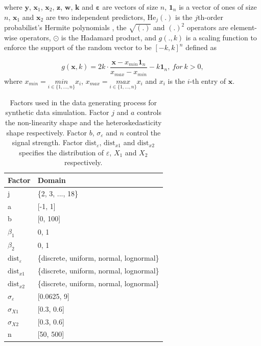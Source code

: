 \documentclass[]{interact}
\theoremstyle{plain}%
\theoremstyle{definition}
\theoremstyle{remark}
\begin{document}
\noindent where \(\boldsymbol{y}\), \(\boldsymbol{x}_1\),
\(\boldsymbol{x}_2\), \(\boldsymbol{z}\), \(\boldsymbol{w}\),
\(\boldsymbol{k}\) and \(\boldsymbol{\varepsilon}\) are vectors of size
\(n\), \(\boldsymbol{1}_n\) is a vector of ones of size \(n\),
\(\boldsymbol{x}_1\) and \(\boldsymbol{x}_2\) are two independent
predictors, \(\text{He}_j(.)\) is the \(j\)th-order probabilist's
Hermite polynomials \citep{hermite1864nouveau}, the \(\sqrt{(.)}\) and
\((.)^2\) operators are element-wise operators, \(\odot\) is the
Hadamard product, and \(g(., k)\) is a scaling function to enforce the
support of the random vector to be \([-k, k]^n\) defined as

\[g(\boldsymbol{x}, k) = 2k \cdot \frac{\boldsymbol{x} - x_{min}\boldsymbol{1}_n}{x_{max} - x_{min}} - k\boldsymbol{1}_n,~for~k > 0,\]
\noindent where \(x_{min} = \underset{i \in \{ 1,...,n\}}{min} x_i\),
\(x_{max} = \underset{i \in \{ 1,...,n\}}{max} x_i\) and \(x_i\) is the
\(i\)-th entry of \(\boldsymbol{x}\).

\begin{table}

\caption{\label{tab:factor}Factors used in the data generating process for synthetic data simulation. Factor $j$ and $a$ controls the non-linearity shape and the heteroskedasticity shape respectively. Factor $b$, $\sigma_\varepsilon$ and $n$ control the signal strength. Factor $\text{dist}_\varepsilon$, $\text{dist}_{x1}$ and $\text{dist}_{x2}$ specifies the distribution of $\varepsilon$, $X_1$ and $X_2$ respectively.}
\centering
\begin{tabular}[t]{ll}
\toprule
Factor & Domain\\
\midrule
j & \{2, 3, ..., 18\}\\
a & {}[-1, 1]\\
b & {}[0, 100]\\
$\beta_1$ & {0, 1}\\
$\beta_2$ & {0, 1}\\
\addlinespace
$\text{dist}_\varepsilon$ & \{discrete, uniform, normal, lognormal\}\\
$\text{dist}_{x1}$ & \{discrete, uniform, normal, lognormal\}\\
$\text{dist}_{x2}$ & \{discrete, uniform, normal, lognormal\}\\
$\sigma_{\varepsilon}$ & {}[0.0625, 9]\\
$\sigma_{X1}$ & {}[0.3, 0.6]\\
\addlinespace
$\sigma_{X2}$ & {}[0.3, 0.6]\\
n & {}[50, 500]\\
\bottomrule
\end{tabular}
\end{table}
\end{document}
